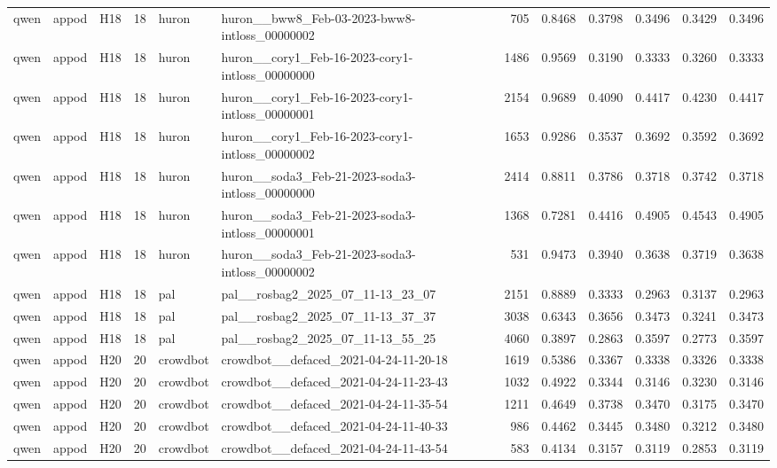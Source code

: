 \begin{table}[tbp]
\begin{tabular}{lllrllrrrrrr}
qwen & appod & H18 & 18 & huron & huron\_\_bww8\_Feb-03-2023-bww8-intloss\_00000002 & 705 & 0.8468 & 0.3798 & 0.3496 & 0.3429 & 0.3496 \\
qwen & appod & H18 & 18 & huron & huron\_\_cory1\_Feb-16-2023-cory1-intloss\_00000000 & 1486 & 0.9569 & 0.3190 & 0.3333 & 0.3260 & 0.3333 \\
qwen & appod & H18 & 18 & huron & huron\_\_cory1\_Feb-16-2023-cory1-intloss\_00000001 & 2154 & 0.9689 & 0.4090 & 0.4417 & 0.4230 & 0.4417 \\
qwen & appod & H18 & 18 & huron & huron\_\_cory1\_Feb-16-2023-cory1-intloss\_00000002 & 1653 & 0.9286 & 0.3537 & 0.3692 & 0.3592 & 0.3692 \\
qwen & appod & H18 & 18 & huron & huron\_\_soda3\_Feb-21-2023-soda3-intloss\_00000000 & 2414 & 0.8811 & 0.3786 & 0.3718 & 0.3742 & 0.3718 \\
qwen & appod & H18 & 18 & huron & huron\_\_soda3\_Feb-21-2023-soda3-intloss\_00000001 & 1368 & 0.7281 & 0.4416 & 0.4905 & 0.4543 & 0.4905 \\
qwen & appod & H18 & 18 & huron & huron\_\_soda3\_Feb-21-2023-soda3-intloss\_00000002 & 531 & 0.9473 & 0.3940 & 0.3638 & 0.3719 & 0.3638 \\
qwen & appod & H18 & 18 & pal & pal\_\_rosbag2\_2025\_07\_11-13\_23\_07 & 2151 & 0.8889 & 0.3333 & 0.2963 & 0.3137 & 0.2963 \\
qwen & appod & H18 & 18 & pal & pal\_\_rosbag2\_2025\_07\_11-13\_37\_37 & 3038 & 0.6343 & 0.3656 & 0.3473 & 0.3241 & 0.3473 \\
qwen & appod & H18 & 18 & pal & pal\_\_rosbag2\_2025\_07\_11-13\_55\_25 & 4060 & 0.3897 & 0.2863 & 0.3597 & 0.2773 & 0.3597 \\
qwen & appod & H20 & 20 & crowdbot & crowdbot\_\_defaced\_2021-04-24-11-20-18 & 1619 & 0.5386 & 0.3367 & 0.3338 & 0.3326 & 0.3338 \\
qwen & appod & H20 & 20 & crowdbot & crowdbot\_\_defaced\_2021-04-24-11-23-43 & 1032 & 0.4922 & 0.3344 & 0.3146 & 0.3230 & 0.3146 \\
qwen & appod & H20 & 20 & crowdbot & crowdbot\_\_defaced\_2021-04-24-11-35-54 & 1211 & 0.4649 & 0.3738 & 0.3470 & 0.3175 & 0.3470 \\
qwen & appod & H20 & 20 & crowdbot & crowdbot\_\_defaced\_2021-04-24-11-40-33 & 986 & 0.4462 & 0.3445 & 0.3480 & 0.3212 & 0.3480 \\
qwen & appod & H20 & 20 & crowdbot & crowdbot\_\_defaced\_2021-04-24-11-43-54 & 583 & 0.4134 & 0.3157 & 0.3119 & 0.2853 & 0.3119 \\

\end{tabular}
\end{table}
